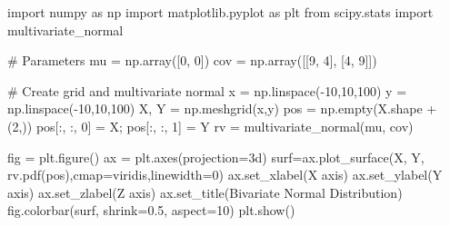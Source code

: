 \documentclass[
  letterpaper,
  DIV=11,
  numbers=noendperiod]{scrreprt}
\newenvironment{Shaded}{\begin{snugshade}}{\end{snugshade}}
\newcommand{\CommentTok}[1]{\textcolor[rgb]{0.37,0.37,0.37}{#1}}
\newcommand{\DecValTok}[1]{\textcolor[rgb]{0.68,0.00,0.00}{#1}}
\newcommand{\FloatTok}[1]{\textcolor[rgb]{0.68,0.00,0.00}{#1}}
\newcommand{\ImportTok}[1]{\textcolor[rgb]{0.00,0.46,0.62}{#1}}
\newcommand{\NormalTok}[1]{\textcolor[rgb]{0.00,0.23,0.31}{#1}}
\newcommand{\OperatorTok}[1]{\textcolor[rgb]{0.37,0.37,0.37}{#1}}
\newcommand{\StringTok}[1]{\textcolor[rgb]{0.13,0.47,0.30}{#1}}
\begin{document}
\begin{Shaded}
\begin{Highlighting}[]
\ImportTok{import}\NormalTok{ numpy }\ImportTok{as}\NormalTok{ np}
\ImportTok{import}\NormalTok{ matplotlib.pyplot }\ImportTok{as}\NormalTok{ plt}
\ImportTok{from}\NormalTok{ scipy.stats }\ImportTok{import}\NormalTok{ multivariate\_normal}

\CommentTok{\# Parameters}
\NormalTok{mu }\OperatorTok{=}\NormalTok{ np.array([}\DecValTok{0}\NormalTok{, }\DecValTok{0}\NormalTok{])}
\NormalTok{cov }\OperatorTok{=}\NormalTok{ np.array([[}\DecValTok{9}\NormalTok{, }\DecValTok{4}\NormalTok{], [}\DecValTok{4}\NormalTok{, }\DecValTok{9}\NormalTok{]])}

\CommentTok{\# Create grid and multivariate normal}
\NormalTok{x }\OperatorTok{=}\NormalTok{ np.linspace(}\OperatorTok{{-}}\DecValTok{10}\NormalTok{,}\DecValTok{10}\NormalTok{,}\DecValTok{100}\NormalTok{)}
\NormalTok{y }\OperatorTok{=}\NormalTok{ np.linspace(}\OperatorTok{{-}}\DecValTok{10}\NormalTok{,}\DecValTok{10}\NormalTok{,}\DecValTok{100}\NormalTok{)}
\NormalTok{X, Y }\OperatorTok{=}\NormalTok{ np.meshgrid(x,y)}
\NormalTok{pos }\OperatorTok{=}\NormalTok{ np.empty(X.shape }\OperatorTok{+}\NormalTok{ (}\DecValTok{2}\NormalTok{,))}
\NormalTok{pos[:, :, }\DecValTok{0}\NormalTok{] }\OperatorTok{=}\NormalTok{ X}\OperatorTok{;}\NormalTok{ pos[:, :, }\DecValTok{1}\NormalTok{] }\OperatorTok{=}\NormalTok{ Y}
\NormalTok{rv }\OperatorTok{=}\NormalTok{ multivariate\_normal(mu, cov)}

\NormalTok{fig }\OperatorTok{=}\NormalTok{ plt.figure()}
\NormalTok{ax }\OperatorTok{=}\NormalTok{ plt.axes(projection}\OperatorTok{=}\StringTok{\textquotesingle{}3d\textquotesingle{}}\NormalTok{)  }
\NormalTok{surf}\OperatorTok{=}\NormalTok{ax.plot\_surface(X, Y, rv.pdf(pos),cmap}\OperatorTok{=}\StringTok{\textquotesingle{}viridis\textquotesingle{}}\NormalTok{,linewidth}\OperatorTok{=}\DecValTok{0}\NormalTok{)}
\NormalTok{ax.set\_xlabel(}\StringTok{\textquotesingle{}X axis\textquotesingle{}}\NormalTok{)}
\NormalTok{ax.set\_ylabel(}\StringTok{\textquotesingle{}Y axis\textquotesingle{}}\NormalTok{)}
\NormalTok{ax.set\_zlabel(}\StringTok{\textquotesingle{}Z axis\textquotesingle{}}\NormalTok{)}
\NormalTok{ax.set\_title(}\StringTok{\textquotesingle{}Bivariate Normal Distribution\textquotesingle{}}\NormalTok{)}
\NormalTok{fig.colorbar(surf, shrink}\OperatorTok{=}\FloatTok{0.5}\NormalTok{, aspect}\OperatorTok{=}\DecValTok{10}\NormalTok{)}
\NormalTok{plt.show()}
\end{Highlighting}
\end{Shaded}
\end{document}

